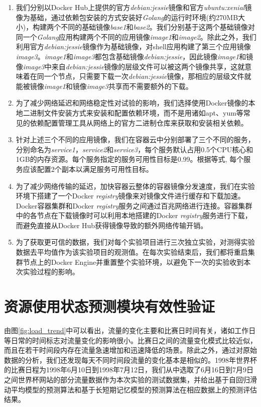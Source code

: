 \begin{enumerate}
\item\label{req:serv_image} 我们分别以Docker Hub上提供的官方\emph{debian:jessie}镜像和官方\emph{ubuntu:xenial}镜像为基础，通过依赖包安装的方式安装好\emph{Golang}的运行时环境(约270MB大小)，构建两个不同的基础镜像\emph{base1}和\emph{base2}。我们分别基于这两个基础镜像对同一个\emph{Golang}应用构建两个不同的应用镜像\emph{image1}和\emph{image2}。除此之外，我们利用官方\emph{debian:jessie}镜像作为基础镜像，对shell应用构建了第三个应用镜像\emph{image3}。\emph{image1}和\emph{image3}都包含基础镜像\emph{debian:jessie}，因此镜像\emph{image1}和镜像\emph{image3}中来自\emph{debian:jessie}镜像的层级文件可以被这两个镜像共享，这就意味着在同一个节点，只需要下载一次\emph{debian:jessie}镜像，那相应的层级文件就能被镜像\emph{image1}和镜像\emph{image3}共享而不需要额外的下载。

\item 为了减少网络延迟和网络稳定性对试验的影响，我们选择使用Docker镜像的本地二进制文件安装方式来安装和配置依赖环境，而不是用诸如apt、yum等常见的依赖配置管理工具从网络上的官方二进制仓库来获取和安装相关依赖。

\item\label{req:serv_aval} 针对上述三个不同的应用镜像，我们在容器云中分别部署了三个不同的服务，分别命名为\emph{service1}，\emph{service2}和\emph{service3}，每个服务默认占用0.5个CPU核心和1GB的内存资源。每个服务指定的服务可用性目标是0.99。根据等式, 每个服务应该配置2个副本以满足服务可用性目标。

\item\label{req:registry_mirror} 为了减少网络传输的延迟，加快容器云整体的容器镜像分发速度，我们在实验环境下搭建了一个Docker \emph{registry}镜像来对镜像文件进行缓存和下载加速。Docker容器集群和Docker \emph{registry}服务之间通过百兆网络进行连接。容器集群中的各节点在下载镜像时可以利用本地搭建的Docker \emph{registry}服务进行下载，而避免直接从Docker Hub获得镜像导致的额外网络传输开销。

\item 为了获取更可信的数据，我们对每个实验项目进行三次独立实验，对测得实验数据去平均值作为该实验项目的观测值。在每次实验结束后，我们都将重启集群节点上的Docker Engine并重置整个实验环境，以避免下一次的实验收到本次实验过程的影响。
\end{enumerate}

\section{资源使用状态预测模块有效性验证}
由图\ref{fig:load_trend}中可以看出，流量的变化主要和比赛日时间有关，诸如工作日等日常的时间标志对流量变化的影响很小。比赛日之间的流量变化模式比较近似，而且在若干时间段内存在流量急速增加和迅速降低的场景。除此之外，通过对原始数据的分析，我们还发现每天不同时间段流量的变化基本是相似的。1998年世界杯的比赛日程为1998年6月10日到1998年7月12日，我们从中选取了6月16日到7月9日之间世界杯网站的部分流量数据作为本次实验的测试数据集，并给出基于自回归滑动平均模型的预测算法和基于长短期记忆模型的预测算法在相应数据上的预测评估结果。

